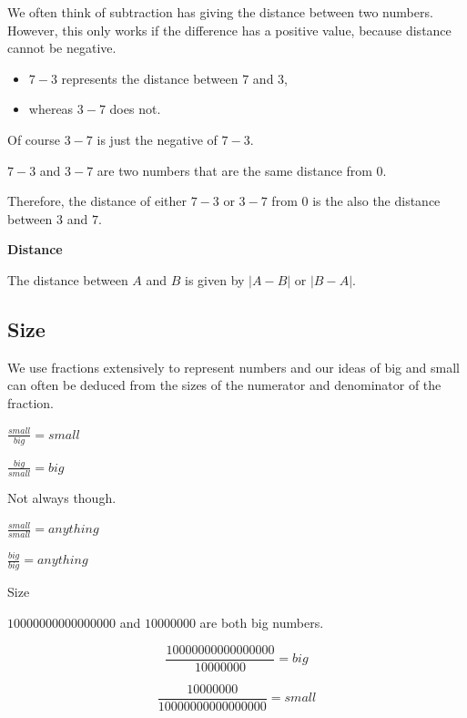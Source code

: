 \documentclass{ximera}
\begin{document}
We often think of subtraction has giving the distance between two numbers. However, this only works if the difference has a positive value, because distance cannot be negative.


\begin{itemize}
\item $7-3$ represents the distance between $7$ and $3$, 
\item whereas $3-7$ does not.
\end{itemize}

Of course $3-7$ is just the negative of $7-3$. 


$7-3$ and $3-7$ are two numbers that are the same distance from $0$. 


 Therefore, the distance of either $7-3$ or $3-7$ from $0$ is the also the distance between $3$ and $7$.  


\begin{idea} \textbf{\textcolor{blue!55!black}{Distance}} 

The distance between $A$ and $B$ is given by $| A - B |$ or $| B - A |$.


\end{idea}







\subsection*{Size}

We use fractions extensively to represent numbers and our ideas of big and small can often be deduced from the sizes of the numerator and denominator of the fraction.



$\frac{small}{big} = small$



$\frac{big}{small} = big$



Not always though. 


$\frac{small}{small} = anything$


$\frac{big}{big} = anything$



\begin{example} Size



$10000000000000000$ and $10000000$ are both big numbers.



\[
\frac{10000000000000000}{10000000} = big
\]


\[
\frac{10000000}{10000000000000000} = small
\]


\end{example}
\end{document}
